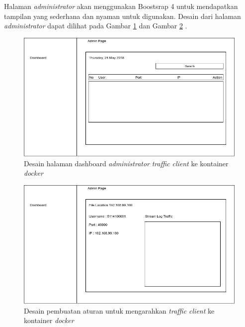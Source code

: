 Halaman \textit{administrator} akan menggunakan Boostsrap 4 untuk mendapatkan tampilan yang sederhana dan nyaman untuk digunakan. Desain dari halaman \textit{administrator} dapat dilihat pada Gambar \ref{desaindashboard} dan Gambar \ref{desainstream} .

\begin{figure}[H]
	\centering
	\includegraphics[width=\linewidth]{images/bab3/desaindashboard}
	\caption{Desain halaman dashboard \textit{administrator} \textit{traffic client} ke kontainer \textit{docker}}
	\label{desaindashboard}
\end{figure}

\begin{figure}[H]
	\centering
	\includegraphics[width=\linewidth]{images/bab3/desainstream}
	\caption{Desain pembuatan aturan untuk mengarahkan \textit{traffic client} ke kontainer \textit{docker}}
	\label{desainstream}
\end{figure}


